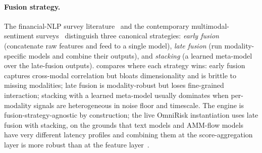 \documentclass[11pt,a4paper]{article}
\begin{document}
\paragraph{Fusion strategy.} The financial-NLP survey
literature~\cite{schumaker2009textual,xing2018natural,day2016deep} and the
contemporary multimodal-sentiment surveys~\cite{lai2023multimodal,gandhi2023multimodal}
distinguish three canonical strategies: \emph{early fusion} (concatenate raw features
and feed to a single model), \emph{late fusion} (run modality-specific models and
combine their outputs), and \emph{stacking} (a learned meta-model over the late-fusion
outputs). \cite{gandhi2023multimodal} compares where each strategy wins: early fusion
captures cross-modal correlation but bloats dimensionality and is brittle to missing
modalities; late fusion is modality-robust but loses fine-grained interaction; stacking
with a learned meta-model usually dominates when per-modality signals are heterogeneous
in noise floor and timescale. The engine is fusion-strategy-agnostic by construction;
the live OmniRisk instantiation uses late fusion with stacking, on the grounds that
text models and AMM-flow models have very different latency profiles and combining
them at the score-aggregation layer is more robust than at the feature
layer~\cite{gandhi2023multimodal,zhang2025sentistack}.
\end{document}
